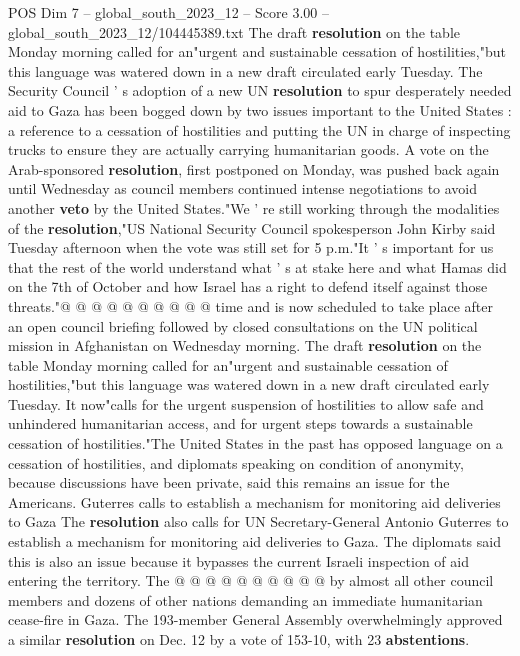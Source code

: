 \begin{textsample}{POS Dim 7 – global\_south\_2023\_12 – Score 3.00 – global\_south\_2023\_12/104445389.txt}  \label{ex:f7_pos_035}
The draft \textbf{resolution} on the table Monday morning called for an"urgent and sustainable cessation of hostilities,"but this language was watered down in a new draft circulated early Tuesday.
The Security Council ' s adoption of a new UN \textbf{resolution} to spur desperately needed aid to Gaza has been bogged down by two issues important to the United States : a reference to a cessation of hostilities and putting the UN in charge of inspecting trucks to ensure they are actually carrying humanitarian goods.
A vote on the Arab-sponsored \textbf{resolution}, first postponed on Monday, was pushed back again until Wednesday as council members continued intense negotiations to avoid another \textbf{veto} by the United States."We ' re still working through the modalities of the \textbf{resolution},"US National Security Council spokesperson John Kirby said Tuesday afternoon when the vote was still set for 5 p.m."It ' s important for us that the rest of the world understand what ' s at stake here and what Hamas did on the 7th of October and how Israel has a right to defend itself against those threats."@ @ @ @ @ @ @ @ @ @ time and is now scheduled to take place after an open council briefing followed by closed consultations on the UN political mission in Afghanistan on Wednesday morning.
The draft \textbf{resolution} on the table Monday morning called for an"urgent and sustainable cessation of hostilities,"but this language was watered down in a new draft circulated early Tuesday.
It now"calls for the urgent suspension of hostilities to allow safe and unhindered humanitarian access, and for urgent steps towards a sustainable cessation of hostilities."The United States in the past has opposed language on a cessation of hostilities, and diplomats speaking on condition of anonymity, because discussions have been private, said this remains an issue for the Americans.
Guterres calls to establish a mechanism for monitoring aid deliveries to Gaza The \textbf{resolution} also calls for UN Secretary-General Antonio Guterres to establish a mechanism for monitoring aid deliveries to Gaza.
The diplomats said this is also an issue because it bypasses the current Israeli inspection of aid entering the territory.
The @ @ @ @ @ @ @ @ @ @ by almost all other council members and dozens of other nations demanding an immediate humanitarian cease-fire in Gaza.
The 193-member General Assembly overwhelmingly approved a similar \textbf{resolution} on Dec. 12 by a vote of 153-10, with 23 \textbf{abstentions}.

\end{textsample}
